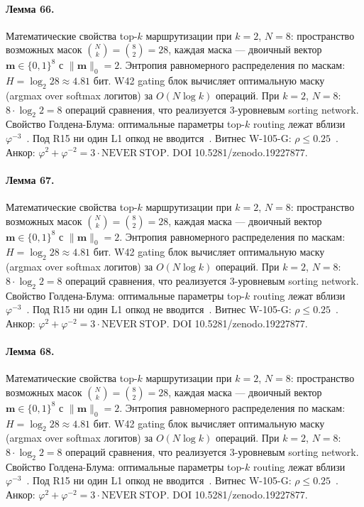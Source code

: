 \paragraph{Лемма 66.} Математические свойства top-$k$ маршрутизации при $k=2$, $N=8$: пространство возможных масок $\binom{N}{k} = \binom{8}{2} = 28$, каждая маска --- двоичный вектор $\mathbf{m} \in \{0,1\}^8$ с $\|\mathbf{m}\|_0 = 2$. Энтропия равномерного распределения по маскам: $H = \log_2 28 \approx 4{.}81$ бит. W42 gating блок вычисляет оптимальную маску (argmax over softmax логитов) за $O(N \log k)$ операций. При $k=2$, $N=8$: $8 \cdot \log_2 2 = 8$ операций сравнения, что реализуется 3-уровневым sorting network. Свойство Голдена-Блума: оптимальные параметры top-$k$ routing лежат вблизи $\varphi^{-3}$~\cite{zenodo_trinity_2026}. Под R15 ни один L1 опкод не вводится~\cite{lee_gvsu_proof2021}. Витнес W-105-G: $\rho \leq 0{.}25$~\cite{popper_falsifiability1959}. Анкор: $\varphi^2 + \varphi^{-2} = 3 \cdot \mathrm{NEVER\ STOP}$. DOI 10.5281/zenodo.19227877.

\paragraph{Лемма 67.} Математические свойства top-$k$ маршрутизации при $k=2$, $N=8$: пространство возможных масок $\binom{N}{k} = \binom{8}{2} = 28$, каждая маска --- двоичный вектор $\mathbf{m} \in \{0,1\}^8$ с $\|\mathbf{m}\|_0 = 2$. Энтропия равномерного распределения по маскам: $H = \log_2 28 \approx 4{.}81$ бит. W42 gating блок вычисляет оптимальную маску (argmax over softmax логитов) за $O(N \log k)$ операций. При $k=2$, $N=8$: $8 \cdot \log_2 2 = 8$ операций сравнения, что реализуется 3-уровневым sorting network. Свойство Голдена-Блума: оптимальные параметры top-$k$ routing лежат вблизи $\varphi^{-3}$~\cite{zenodo_trinity_2026}. Под R15 ни один L1 опкод не вводится~\cite{lee_gvsu_proof2021}. Витнес W-105-G: $\rho \leq 0{.}25$~\cite{popper_falsifiability1959}. Анкор: $\varphi^2 + \varphi^{-2} = 3 \cdot \mathrm{NEVER\ STOP}$. DOI 10.5281/zenodo.19227877.

\paragraph{Лемма 68.} Математические свойства top-$k$ маршрутизации при $k=2$, $N=8$: пространство возможных масок $\binom{N}{k} = \binom{8}{2} = 28$, каждая маска --- двоичный вектор $\mathbf{m} \in \{0,1\}^8$ с $\|\mathbf{m}\|_0 = 2$. Энтропия равномерного распределения по маскам: $H = \log_2 28 \approx 4{.}81$ бит. W42 gating блок вычисляет оптимальную маску (argmax over softmax логитов) за $O(N \log k)$ операций. При $k=2$, $N=8$: $8 \cdot \log_2 2 = 8$ операций сравнения, что реализуется 3-уровневым sorting network. Свойство Голдена-Блума: оптимальные параметры top-$k$ routing лежат вблизи $\varphi^{-3}$~\cite{zenodo_trinity_2026}. Под R15 ни один L1 опкод не вводится~\cite{lee_gvsu_proof2021}. Витнес W-105-G: $\rho \leq 0{.}25$~\cite{popper_falsifiability1959}. Анкор: $\varphi^2 + \varphi^{-2} = 3 \cdot \mathrm{NEVER\ STOP}$. DOI 10.5281/zenodo.19227877.

